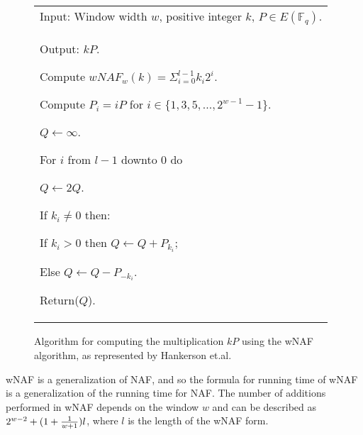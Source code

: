 \begin{figure}[htb!]
	\begin{tabular}{|p{\textwidth}|}
		\hline
		Input: Window width \(w\), positive integer \(k\), \(P \in E(\mathbb{F}_q)\).\\
		Output: \(kP\).
		\begin{enumerate*}
			\item Compute \(wNAF_w(k) = \Sigma^{l-1}_{i=0} k_i 2^i\).
			\item Compute \(P_i = iP\) for \(i \in \{1,3,5,...,2^{w-1}-1\}\).
			\item \(Q \gets \infty\).
			\item For \(i\) from \(l - 1\) downto \(0\) do
			\begin{enumerate*}
				\item \(Q \gets 2Q\).
				\item If \(k_i \neq 0\) then:
				\begin{enumerate*}
					\item If \(k_i > 0\) then \(Q \gets Q + P_{k_i}\);
					\item Else \(Q \gets Q - P_{-k_i}\).
				\end{enumerate*}
			\end{enumerate*}
			\item Return(\(Q\)).
		\end{enumerate*} \\
		\hline
	\end{tabular}
	\caption{Algorithm for computing the multiplication \(kP\) using the wNAF algorithm, as represented by Hankerson et.al.\cite{hankerson2010}}
	\label{fig:wnaf-algorithm}
\end{figure}

wNAF is a generalization of NAF, and so the formula for running time of wNAF is a generalization of the running time for NAF. The number of
additions performed in wNAF depends on the window \(w\) and can be described as \(2^{w-2} + (1 + {1 \over {w + 1}}) l\), where \(l\) is the length
of the wNAF form.